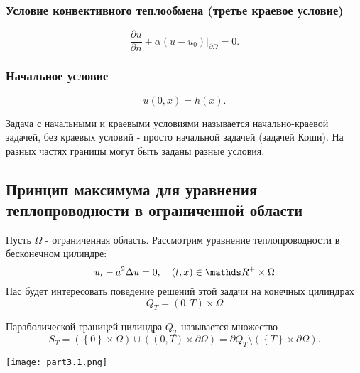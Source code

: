 \subsubsection{Условие конвективного теплообмена (третье краевое условие)}
$$ \frac {\partial u} {\partial n} + \alpha (u - u_0) \Bigg\rvert_{\partial \Omega} = 0.$$

\subsubsection{Начальное условие}
$$ u(0, x) = h(x).$$


Задача с начальными и краевыми условиями называется начально-краевой задачей, без краевых условий - просто начальной задачей (задачей Коши). На разных частях границы могут быть заданы разные условия.

\subsection{Принцип максимума для уравнения теплопроводности в ограниченной области}
Пусть $\Omega$ - ограниченная область. Рассмотрим уравнение теплопроводности в бесконечном цилиндре: $$ u_t - a^2 \Delta u = 0, \quad  (t,x) \in \real^+ \times \Omega$$
Нас будет интересовать поведение решений этой задачи на конечных цилиндрах $$ Q_T = (0, T) \times \Omega $$

\begin{definition}
Параболической границей цилиндра $Q_T$ называется множество
$$ S_T = (\left\{ 0 \right\} \times \Omega) \cup ((0,T) \times \partial \Omega) = \partial Q_T \setminus (\left\{ T \right\} \times \partial \Omega) .$$
\end{definition}

\begin{center}
\texttt{[image: part3.1.png]}
\end{center}

